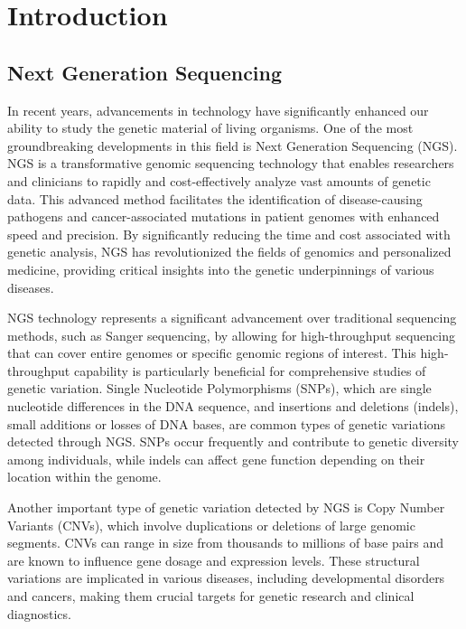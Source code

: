 \documentclass[a4paper,12pt,twoside]{ThesisStyle}
\begin{document}
\listoffigures

\listoftables

\mainmatter

\chapter{Introduction}
\label{cap:intro}
\section{Next Generation Sequencing}
In recent years, advancements in technology have significantly enhanced our ability to study the genetic material of living organisms. One of the most groundbreaking developments in this field is Next Generation Sequencing (NGS). NGS is a transformative genomic sequencing technology that enables researchers and clinicians to rapidly and cost-effectively analyze vast amounts of genetic data. This advanced method facilitates the identification of disease-causing pathogens and cancer-associated mutations in patient genomes with enhanced speed and precision. By significantly reducing the time and cost associated with genetic analysis, NGS has revolutionized the fields of genomics and personalized medicine, providing critical insights into the genetic underpinnings of various diseases.

NGS technology represents a significant advancement over traditional sequencing methods, such as Sanger sequencing, by allowing for high-throughput sequencing that can cover entire genomes or specific genomic regions of interest. This high-throughput capability is particularly beneficial for comprehensive studies of genetic variation. Single Nucleotide Polymorphisms (SNPs), which are single nucleotide differences in the DNA sequence, and insertions and deletions (indels), small additions or losses of DNA bases, are common types of genetic variations detected through NGS. SNPs occur frequently and contribute to genetic diversity among individuals, while indels can affect gene function depending on their location within the genome.

Another important type of genetic variation detected by NGS is Copy Number Variants (CNVs), which involve duplications or deletions of large genomic segments. CNVs can range in size from thousands to millions of base pairs and are known to influence gene dosage and expression levels. These structural variations are implicated in various diseases, including developmental disorders and cancers, making them crucial targets for genetic research and clinical diagnostics.
\end{document}
